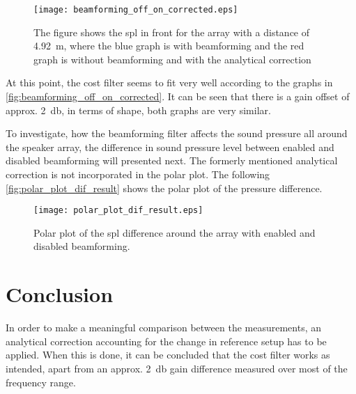   \begin{figure}[H]
	\centering
	\texttt{[image: beamforming\_off\_on\_corrected.eps]}
	\caption{The figure shows the \gls{spl} in front for the array with a distance of \SI{4.92}{\meter}, where the blue graph is with beamforming and the red graph is without beamforming and with the analytical correction}
		\label{fig:beamforming_off_on_corrected}
\end{figure}

At this point, the cost filter seems to fit very well according to the graphs in \autoref{fig:beamforming_off_on_corrected}. It can be seen that there is a gain offset of approx. \SI{2}{\decibel}, in terms of shape, both graphs are very similar. 

To investigate, how the beamforming filter affects the sound pressure all around the speaker array, the difference in sound pressure level between enabled and disabled beamforming will presented next. The formerly mentioned analytical correction is not incorporated in the polar plot. The following \autoref{fig:polar_plot_dif_result} shows the polar plot of the pressure difference. 


 \begin{figure}[H]
	\centering
	\texttt{[image: polar\_plot\_dif\_result.eps]}
	\caption{Polar plot of the \gls{spl} difference around the array with enabled and disabled beamforming.}
		\label{fig:polar_plot_dif_result}
\end{figure}




\section{Conclusion}
In order to make a meaningful comparison between the measurements, an analytical correction accounting for the change in reference setup has to be applied. When this is done, it can be concluded that the cost filter works as intended, apart from an approx. \SI{2}{\decibel} gain difference measured over most of the frequency range.


